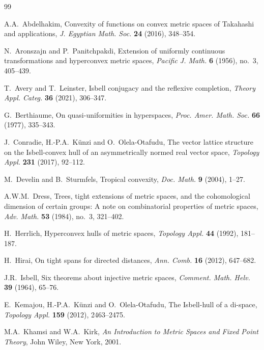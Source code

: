 \documentclass[preprint,12pt]{elsarticle}
\numberwithin{equation}{section}
\begin{document}
\begin{thebibliography}{99}

A.A.~Abdelhakim,
Convexity of functions on convex metric spaces of Takahashi and applications,
\emph{J. Egyptian Math. Soc.} \textbf{24} (2016), 348--354.

N.~Aronszajn and P.~Panitchpakdi,
Extension of uniformly continuous transformations and hyperconvex metric spaces,
\emph{Pacific J. Math.} \textbf{6} (1956), no.~3, 405--439.

T.~Avery and T.~Leinster,
Isbell conjugacy and the reflexive completion,
\emph{Theory Appl. Categ.} \textbf{36} (2021), 306--347.

G.~Berthiaume,
On quasi-uniformities in hyperspaces,
\emph{Proc. Amer. Math. Soc.} \textbf{66} (1977), 335--343.

J.~Conradie, H.-P.A.~K\"unzi and O.~Olela-Otafudu,
The vector lattice structure on the Isbell-convex hull of an asymmetrically normed real vector space,
\emph{Topology Appl.} \textbf{231} (2017), 92--112.

M.~Develin and B.~Sturmfels,
Tropical convexity,
\emph{Doc. Math.} \textbf{9} (2004), 1--27.

A.W.M.~Dress,
Trees, tight extensions of metric spaces, and the cohomological dimension of certain groups:
A note on combinatorial properties of metric spaces,
\emph{Adv. Math.} \textbf{53} (1984), no.~3, 321--402.

H.~Herrlich,
Hyperconvex hulls of metric spaces,
\emph{Topology Appl.} \textbf{44} (1992), 181--187.

H.~Hirai,
On tight spans for directed distances,
\emph{Ann. Comb.} \textbf{16} (2012), 647--682.

J.R.~Isbell,
Six theorems about injective metric spaces,
\emph{Comment. Math. Helv.} \textbf{39} (1964), 65--76.

E.~Kemajou, H.-P.A.~K\"unzi and O.~Olela-Otafudu,
The Isbell-hull of a di-space,
\emph{Topology Appl.} \textbf{159} (2012), 2463--2475.

M.A.~Khamsi and W.A.~Kirk,
\emph{An Introduction to Metric Spaces and Fixed Point Theory},
John Wiley, New York, 2001.


\end{thebibliography}
\end{document}
